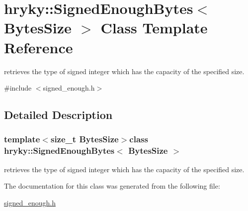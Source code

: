 \hypertarget{classhryky_1_1_signed_enough_bytes}{\section{hryky\-:\-:Signed\-Enough\-Bytes$<$ Bytes\-Size $>$ Class Template Reference}
\label{classhryky_1_1_signed_enough_bytes}
}


retrieves the type of signed integer which has the capacity of the specified size.  




{\ttfamily \#include $<$signed\-\_\-enough.\-h$>$}



\subsection{Detailed Description}
\subsubsection*{template$<$size\-\_\-t Bytes\-Size$>$class hryky\-::\-Signed\-Enough\-Bytes$<$ Bytes\-Size $>$}

retrieves the type of signed integer which has the capacity of the specified size. 

The documentation for this class was generated from the following file\-:\begin{DoxyCompactItemize}
\item 
\hyperlink{signed__enough_8h}{signed\-\_\-enough.\-h}\end{DoxyCompactItemize}
